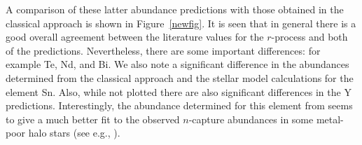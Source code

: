 \documentclass[12pt,preprint]{aastex}
\begin{document}
{A comparison of these latter abundance predictions  with those obtained in the classical approach is shown in Figure~\ref{newfig}.   It is seen that in general there is a good overall agreement between the literature  values for the $r$-process and both of the predictions. Nevertheless, there are some important differences: for example Te, Nd, and Bi. We also note  a significant difference in the abundances determined from the classical approach and the stellar model calculations for the element Sn.  Also, while  not plotted there are also significant differences in the Y predictions. Interestingly, the abundance determined for this element from \citet{Arlandini1999} seems to give a much better fit to the  observed $n$-capture abundances in some metal-poor halo stars (see e.g., \citealt{Cowan2002}).













}
\end{document}
